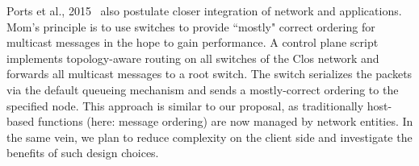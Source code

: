 Ports et al., 2015~\cite{mom} also postulate closer integration of network and applications. Mom's principle is to use switches to provide ``mostly" correct ordering for multicast messages in the hope to gain performance. A control plane script implements topology-aware routing on all switches of the Clos network and forwards all multicast messages to a root switch. The switch serializes the packets via the default queueing mechanism and sends a mostly-correct ordering to the specified node. This approach is similar to our proposal, as traditionally host-based functions (here: message ordering) are now managed by network entities. In the same vein, we plan to reduce complexity on the client side and investigate the benefits of such design choices.
